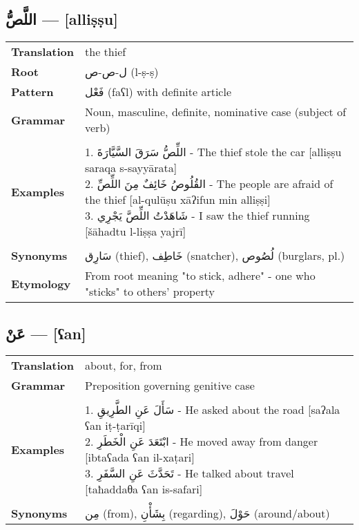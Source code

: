 \documentclass[letter,12pt]{article}
\begin{document}
\subsection{\textarabic{اللَّصُّ} — [alliṣṣu]}
\begin{tabular}{p{3cm}p{10cm}}
\toprule
\textbf{Translation} & the thief \\
\textbf{Root} & \textarabic{ل-ص-ص} (l-ṣ-ṣ) \\
\textbf{Pattern} & \textarabic{فَعْل} (faʕl) with definite article \\
\textbf{Grammar} & Noun, masculine, definite, nominative case (subject of verb) \\
\midrule \\
\textbf{Examples} & \makecell[l]{\parbox{9.5cm}{
1. \textarabic{اللِّصُّ سَرَقَ السَّيَّارَةَ} - The thief stole the car [alliṣṣu saraqa s-sayyārata]\\
2. \textarabic{القُلُوصُ خَائِفٌ مِنَ اللِّصِّ} - The people are afraid of the thief [al-qulūṣu xāʔifun min alliṣṣi]\\
3. \textarabic{شَاهَدْتُ اللِّصَّ يَجْرِي} - I saw the thief running [šāhadtu l-liṣṣa yajrī]
}} \\
\midrule \\
\textbf{Synonyms} & \textarabic{سَارِق} (thief), \textarabic{خَاطِف} (snatcher), \textarabic{لُصُوص} (burglars, pl.) \\
\textbf{Etymology} & From root meaning "to stick, adhere" - one who "sticks" to others' property \\
\bottomrule
\end{tabular}

\subsection{\textarabic{عَنْ} — [ʕan]}
\begin{tabular}{p{3cm}p{10cm}}
\toprule
\textbf{Translation} & about, for, from \\
\textbf{Grammar} & Preposition governing genitive case \\
\midrule \\
\textbf{Examples} & \makecell[l]{\parbox{9.5cm}{
1. \textarabic{سَأَلَ عَنِ الطَّرِيقِ} - He asked about the road [saʔala ʕan iṭ-ṭarīqi]\\
2. \textarabic{ابْتَعَدَ عَنِ الْخَطَرِ} - He moved away from danger [ibtaʕada ʕan il-xaṭari]\\
3. \textarabic{تَحَدَّثَ عَنِ السَّفَرِ} - He talked about travel [taħaddaθa ʕan is-safari]
}} \\
\midrule \\
\textbf{Synonyms} & \textarabic{مِن} (from), \textarabic{بِشَأْنِ} (regarding), \textarabic{حَوْلَ} (around/about) \\
\bottomrule
\end{tabular}
\end{document}
